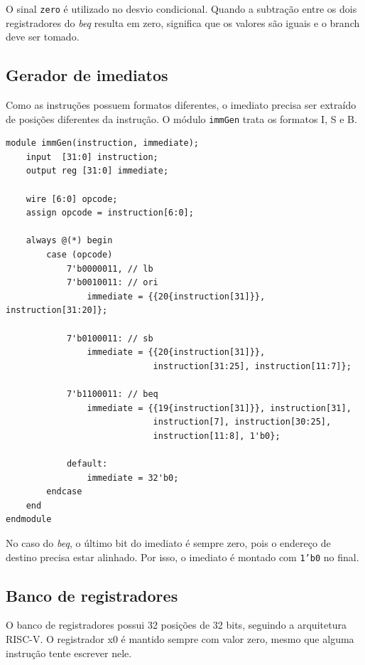 \documentclass[12pt,a4paper]{article}
\begin{document}
O sinal \texttt{zero} é utilizado no desvio condicional. Quando a subtração entre os dois registradores do \textit{beq} resulta em zero, significa que os valores são iguais e o branch deve ser tomado.

\subsection{Gerador de imediatos}

Como as instruções possuem formatos diferentes, o imediato precisa ser extraído de posições diferentes da instrução. O módulo \texttt{immGen} trata os formatos I, S e B.

\begin{lstlisting}[style=verilogstyle,caption={Extração dos imediatos no módulo immGen.}]
module immGen(instruction, immediate);
    input  [31:0] instruction;
    output reg [31:0] immediate;

    wire [6:0] opcode;
    assign opcode = instruction[6:0];

    always @(*) begin
        case (opcode)
            7'b0000011, // lb
            7'b0010011: // ori
                immediate = {{20{instruction[31]}}, instruction[31:20]};

            7'b0100011: // sb
                immediate = {{20{instruction[31]}},
                             instruction[31:25], instruction[11:7]};

            7'b1100011: // beq
                immediate = {{19{instruction[31]}}, instruction[31],
                             instruction[7], instruction[30:25],
                             instruction[11:8], 1'b0};

            default:
                immediate = 32'b0;
        endcase
    end
endmodule
\end{lstlisting}

No caso do \textit{beq}, o último bit do imediato é sempre zero, pois o endereço de destino precisa estar alinhado. Por isso, o imediato é montado com \texttt{1'b0} no final.

\subsection{Banco de registradores}

O banco de registradores possui 32 posições de 32 bits, seguindo a arquitetura RISC-V. O registrador x0 é mantido sempre com valor zero, mesmo que alguma instrução tente escrever nele.
\end{document}
